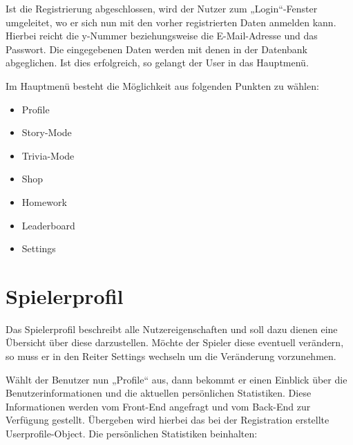 Ist die Registrierung abgeschlossen, wird der Nutzer zum „Login“-Fenster umgeleitet, wo er sich nun mit den vorher registrierten Daten anmelden 
kann. Hierbei reicht die y-Nummer beziehungsweise die E-Mail-Adresse und das Passwort. Die eingegebenen Daten werden mit denen in der 
Datenbank abgeglichen. Ist dies erfolgreich, so gelangt der User in das Hauptmen\"u.

Im Hauptmen\"u besteht die M\"oglichkeit aus folgenden Punkten zu w\"ahlen:

\begin{itemize}
	\item Profile
	\item Story-Mode
	\item Trivia-Mode
	\item Shop
	\item Homework
	\item Leaderboard
	\item Settings 
\end{itemize}

\section{Spielerprofil}
Das Spielerprofil beschreibt alle Nutzereigenschaften und soll dazu dienen eine \"Ubersicht \"uber diese darzustellen. M\"ochte der Spieler diese
eventuell ver\"andern, so muss er in den Reiter Settings wechseln um die Ver\"anderung vorzunehmen.

W\"ahlt der Benutzer nun „Profile“ aus, dann bekommt er einen Einblick \"uber die Benutzerinformationen und die aktuellen pers\"onlichen 
Statistiken. Diese Informationen werden vom Front-End angefragt und vom Back-End zur Verf\"ugung gestellt. \"Ubergeben wird hierbei das bei der 
Registration erstellte Userprofile-Object.
Die pers\"onlichen Statistiken beinhalten:

